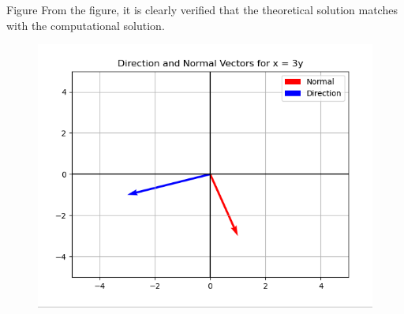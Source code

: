 \documentclass{beamer}
\begin{document}
\begin{frame}{Figure}
From the figure, it is clearly verified that the theoretical solution matches with the computational solution.
\begin{figure}[h!]
    \centering
    \includegraphics[height=0.5\textheight, keepaspectratio]{figs/fig.png}
\end{figure}
\end{frame}
\end{document}

